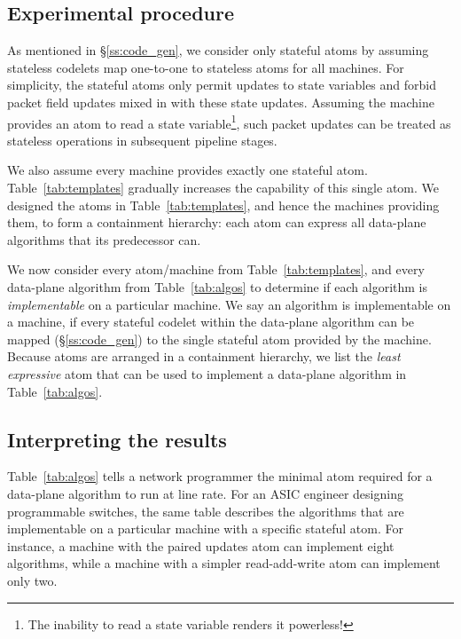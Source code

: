 \subsection{Experimental procedure}
As mentioned in \S\ref{ss:code_gen}, we consider only stateful atoms by
assuming stateless codelets map one-to-one to stateless atoms for all
\absmachine machines. For simplicity, the stateful atoms only permit updates to
state variables and forbid packet field updates mixed in with these state
updates.  Assuming the \absmachine machine provides an atom to read a state
variable\footnote{The inability to read a state variable renders it
powerless!}, such packet updates can be treated as stateless operations in
subsequent pipeline stages.

We also assume every \absmachine machine provides exactly one stateful atom.
Table~\ref{tab:templates} gradually increases the capability of this single
atom.  We designed the atoms in Table~\ref{tab:templates}, and hence the
\absmachine machines providing them, to form a containment hierarchy: each atom
can express all data-plane algorithms that its predecessor can.

We now consider every atom/\absmachine machine from Table~\ref{tab:templates},
and every data-plane algorithm from Table~\ref{tab:algos} to determine if each
algorithm is \textit{implementable} on a particular \absmachine machine. We say
an algorithm is implementable on a \absmachine machine, if every stateful
codelet within the data-plane algorithm can be mapped (\S\ref{ss:code_gen}) to
the single stateful atom provided by the \absmachine machine. Because atoms are
arranged in a containment hierarchy, we list the \textit{least expressive} atom
that can be used to implement a data-plane algorithm in Table~\ref{tab:algos}.

\subsection{Interpreting the results}
Table~\ref{tab:algos} tells a network programmer the minimal atom required for
a data-plane algorithm to run at line rate. For an ASIC engineer designing
programmable switches, the same table describes the algorithms that are
implementable on a particular \absmachine machine with a specific stateful
atom. For instance, a \absmachine machine with the paired updates atom can
implement eight algorithms, while a machine with a simpler read-add-write atom
can implement only two.


